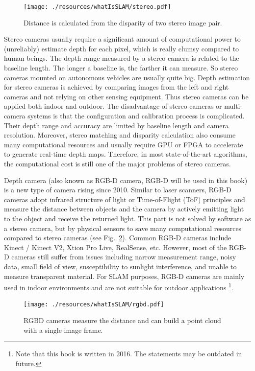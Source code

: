 \begin{figure}
    \centering
    \texttt{[image: ./resources/whatIsSLAM/stereo.pdf]}
    \caption{Distance is calculated from the disparity of two stereo image pair.}
    \label{fig:stereo}
\end{figure}

Stereo cameras usually require a significant amount of computational power to (unreliably) estimate depth for each pixel, which is really clumsy compared to human beings. The depth range measured by a stereo camera is related to the baseline length. The longer a baseline is, the farther it can measure. So stereo cameras mounted on autonomous vehicles are usually quite big. Depth estimation for stereo cameras is achieved by comparing images from the left and right cameras and not relying on other sensing equipment. Thus stereo cameras can be applied both indoor and outdoor. The disadvantage of stereo cameras or multi-camera systems is that the configuration and calibration process is complicated. Their depth range and accuracy are limited by baseline length and camera resolution. Moreover, stereo matching and disparity calculation also consume many computational resources and usually require GPU or FPGA to accelerate to generate real-time depth maps. Therefore, in most state-of-the-art algorithms, the computational cost is still one of the major problems of stereo cameras.

Depth camera (also known as RGB-D camera, RGB-D will be used in this book) is a new type of camera rising since 2010. Similar to laser scanners, RGB-D cameras adopt infrared structure of light or Time-of-Flight (ToF) principles and measure the distance between objects and the camera by actively emitting light to the object and receive the returned light. This part is not solved by software as a stereo camera, but by physical sensors to save many computational resources compared to stereo cameras (see Fig.~\ref{fig:RGBD}). Common RGB-D cameras include Kinect / Kinect V2, Xtion Pro Live, RealSense, etc. However, most of the RGB-D cameras still suffer from issues including narrow measurement range, noisy data, small field of view, susceptibility to sunlight interference, and unable to measure transparent material. For SLAM purposes, RGB-D cameras are mainly used in indoor environments and are not suitable for outdoor applications \footnote{Note that this book is written in 2016. The statements may be outdated in future.}.

\begin{figure}
    \centering
    \texttt{[image: ./resources/whatIsSLAM/rgbd.pdf]}
    \caption{RGBD cameras measure the distance and can build a point cloud with a single image frame.}
    \label{fig:RGBD}
\end{figure}

